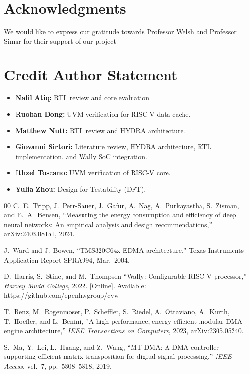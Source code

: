 \documentclass[conference]{IEEEtran}
\begin{document}
\section{Acknowledgments}
    We would like to express our gratitude towards Professor Welsh and Professor Simar for their support of our project.
\section{Credit Author Statement}
    \begin{itemize}
        \item \textbf{Nafil Atiq:} RTL review and core evaluation. %
        \item \textbf{Ruohan Dong:} UVM verification for RISC-V data cache.
        \item \textbf{Matthew Nutt:} RTL review and HYDRA architecture.
        \item \textbf{Giovanni Sirtori:} Literature review, HYDRA architecture, RTL implementation, and Wally SoC integration.
        \item \textbf{Ithzel Toscano:} UVM verification of RISC-V core.
        \item \textbf{Yulia Zhou:} Design for Testability (DFT).
    \end{itemize}
\begin{thebibliography}{00}
    C.~E.~Tripp, J.~Perr-Sauer, J.~Gafur, A.~Nag, A.~Purkayastha,
    S.~Zisman, and E.~A.~Bensen, ``Measuring the energy consumption and
    efficiency of deep neural networks: An empirical analysis and design
    recommendations,'' arXiv:2403.08151, 2024.
    
    J.~Ward and J.~Bowen, ``TMS320C64x EDMA architecture,'' Texas
    Instruments Application Report SPRA994, Mar.\ 2004.

    D.~Harris, S.~Stine, and M.~Thompson ``Wally: Configurable
    RISC-V processor,'' \textit{Harvey Mudd College}, 2022. [Online].
    Available: https://github.com/openhwgroup/cvw

    T.~Benz, M.~Rogenmoser, P.~Scheffler, S.~Riedel, A.~Ottaviano,
    A.~Kurth, T.~Hoefler, and L.~Benini, ``A high-performance,
    energy-efficient modular DMA engine architecture,'' \textit{IEEE
    Transactions on Computers}, 2023, arXiv:2305.05240.
    
    S.~Ma, Y.~Lei, L.~Huang, and Z.~Wang, ``MT-DMA: A DMA controller
    supporting efficient matrix transposition for digital signal
    processing,'' \textit{IEEE Access}, vol.~7, pp.~5808--5818, 2019.
\end{thebibliography}
\vspace{12pt}
\end{document}
